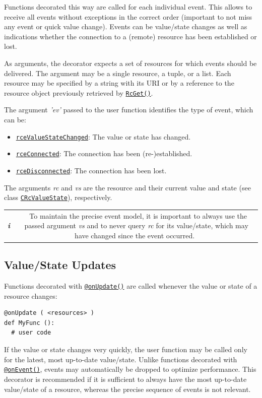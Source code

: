 \documentclass[12pt,english,parskip=half,headheight=19pt]{scrreprt}
\newcommand{\infobox}[1]{
  \par
  \medskip
  \hfill
  \setlength\arrayrulewidth{1pt}
  \begin{tabular}[t]{c|c|}
    \parbox{1.8em}{\hfill\textit{\Huge\textbf{i}\,}}
    &
    \,\parbox{0.89\linewidth}{\setlength{\parskip}{0.5em} \small #1}\,
  \end{tabular}
  \medskip
  \par
}
\newcommand{\refapic}[1]{\href{home2l-api_c/index.html}{\mbox{\texttt{#1}}}}            %
\newcommand{\refapipython}[1]{\href{home2l-api_python/index.html}{\mbox{\texttt{#1}}}}  %
\begin{document}
Functions decorated this way are called for each individual event. This allows to receive all events without exceptions in the correct order (important to not miss any event or quick value change). Events can be value/state changes as well as indications whether the connection to a (remote) resource has been established or lost.

As arguments, the decorator expects a set of resources for which events should be delivered. The argument may be a single resource, a tuple, or a list. Each resource may be specified by a string with its URI or by a reference to the resource object previously retrieved by \refapipython{RcGet()}.

The argument \textit{'ev'} passed to the user function identifies the type of event,
which can be:
\begin{itemize}
  \item \refapic{rceValueStateChanged}: The value or state has changed.
  \item \refapic{rceConnected}: The connection has been (re-)established.
  \item \refapic{rceDisconnected}: The connection has been lost.
\end{itemize}
The arguments \textit{rc} and \textit{vs} are the resource and their
current value and state (see class \refapic{CRcValueState}), respectively.

\infobox{
  To maintain the precise event model, it is important to always use the passed argument
  \textit{vs} and to never query \textit{rc} for its value/state, which may have changed since the event occurred.
}



\subsection{Value/State Updates}

Functions decorated with \refapipython{@onUpdate()} are called whenever the value or state of a resource changes:
\begin{lstlisting}
@onUpdate ( <resources> )
def MyFunc ():
  # user code
\end{lstlisting}

If the value or state changes very quickly, the user function may be called only for the
latest, most up-to-date value/state. Unlike functions decorated with
\refapipython{@onEvent()}, events may automatically be dropped to optimize performance.
This decorator is recommended if it is sufficient to always have the most up-to-date
value/state of a resource, whereas the precise sequence of events is not relevant.
\end{document}
